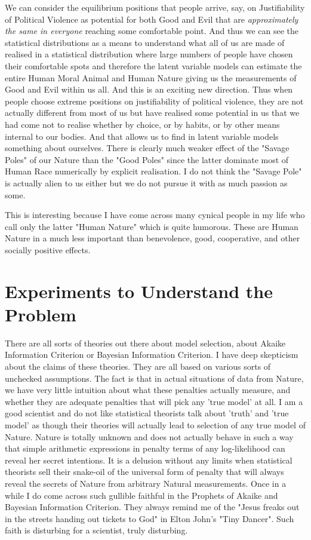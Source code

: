 \documentclass{amsart}
\begin{document}
We can consider the equilibrium positions that people arrive, say, on Justifiability of Political Violence as potential for both Good and Evil that are {\em approximately the same in everyone} reaching some comfortable point.  And thus we can see the statistical distributions as a means to understand what all of us are made of realised in a statistical distribution where large numbers of people have chosen their comfortable spots and therefore the latent variable models can estimate the entire Human Moral Animal and Human Nature giving us the measurements of Good and Evil within us all.  And this is an exciting new direction.  Thus when people choose extreme positions on justifiability of political violence, they are not actually different from most of us but have realised some potential in us that we had come not to realise whether by choice, or by habits, or by other means internal to our bodies.  And that allows us to find in latent variable models something about ourselves.  There is clearly much weaker effect of the "Savage Poles" of our Nature than the "Good Poles" since the latter dominate most of Human Race numerically by explicit realisation.  I do not think the "Savage Pole" is actually alien to us either but we do not pursue it with as much passion as some.

This is interesting because I have come across many cynical people in my life who call only the latter "Human Nature" which is quite humorous.  These are Human Nature in a much less important than benevolence, good, cooperative, and other socially positive effects.  


\section{Experiments to Understand the Problem}

There are all sorts of theories out there about model selection, about Akaike Information Criterion or Bayesian Information Criterion.  I have deep skepticism about the claims of these theories.  They are all based on various sorts of unchecked assumptions.  The fact is that in actual situations of data from Nature, we have very little intuition about what these penalties actually measure, and whether they are adequate penalties that will pick any 'true model' at all.  I am a good scientist and do not like statistical theorists talk about 'truth' and 'true model' as though their theories will actually lead to selection of any true model of Nature.  Nature is totally unknown and does not actually behave in such a way that simple arithmetic expressions in penalty terms of any log-likelihood can reveal her secret intentions.  It is a delusion without any limits when statistical theorists sell their snake-oil of the universal form of penalty that will always reveal the secrets of Nature from arbitrary Natural measurements.  Once in a while I do come across such gullible faithful in the Prophets of Akaike and Bayesian Information Criterion.  They always remind me of the "Jesus freaks out in the streets handing out tickets to God" in Elton John's "Tiny Dancer".  Such faith is disturbing for a scientist, truly disturbing.
\end{document}
